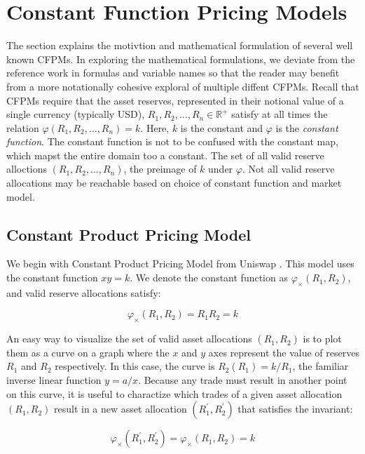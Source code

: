 \documentclass{article}
\begin{document}
\section{Constant Function Pricing Models}
\label{sec:cfpm}

The section explains the motivtion and mathematical formulation of several well known CFPMs. In exploring the mathematical formulations, we deviate from the reference work in formulas and variable names so that the reader may benefit from a more notationally cohesive exploral of multiple diffent CFPMs. Recall that CFPMs require that the asset reserves, represented in their notional value of a single currency (typically USD), $R_{1}, R_{2}, \dots, R_{n} \in \mathbb{R}^{+}$ satisfy at all times the relation $\varphi(R_{1}, R_{2}, \dots, R_{n}) = k$. Here, $k$ is the constant and $\varphi$ is the \emph{constant function}. The constant function is not to be confused with the constant map, which mapst the entire domain too a constant. The set of all valid reserve alloctions $(R_{1}, R_{2}, \dots, R_{n})$, the preimage of $k$ under $\varphi$. Not all valid reserve allocations may be reachable based on choice of constant function and market model.

\subsection{Constant Product Pricing Model}
\label{sec:cspm}
We begin with Constant Product Pricing Model from Uniswap \cite{uniswapv2}. This model uses the constant function $xy = k$. We denote the constant function as $\varphi_{\times}(R_{1}, R_{2})$, and valid reserve allocations satisfy:

\begin{equation}
\label{eq:cppm}
\varphi_{\times}(R_1, R_2) = R_1R_2 = k
\end{equation}

An easy way to visualize the set of valid asset allocations $(R_{1}, R_{2})$ is to plot them as a curve on a graph where the $x$ and $y$ axes represent the value of reserves $R_1$ and $R_2$ respectively. In this case, the curve is $R_2(R_1) = k / R_1$, the familiar inverse linear function $y = a / x$. Because any trade must result in another point on this curve, it is useful to charactize which trades of a given asset allocation $(R_{1}, R_{2})$ result in a new asset allocation $(R_{1}^{\prime}, R_{2}^{\prime})$ that satisfies the invariant:

\begin{equation}
\label{eq:cppm_invariant}
\varphi_{\times}(R_{1}^{\prime}, R_{2}^{\prime}) = \varphi_{\times}(R_{1}, R_{2}) = k
\end{equation}
\end{document}

